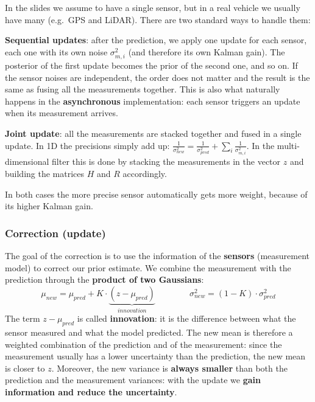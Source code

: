 \begin{infobox}
In the slides we assume to have a single sensor, but in a real vehicle we usually have many (e.g.\ GPS and LiDAR). There are two standard ways to handle them:
\begin{compactitemize}
    \item \textbf{Sequential updates}: after the prediction, we apply one update for each sensor, each one with its own noise $\sigma^2_{m,i}$ (and therefore its own Kalman gain). The posterior of the first update becomes the prior of the second one, and so on. If the sensor noises are independent, the order does not matter and the result is the same as fusing all the measurements together. This is also what naturally happens in the \textbf{asynchronous} implementation: each sensor triggers an update when its measurement arrives.
    \item \textbf{Joint update}: all the measurements are stacked together and fused in a single update. In 1D the precisions simply add up: $\frac{1}{\sigma^2_{new}} = \frac{1}{\sigma^2_{pred}} + \sum_i \frac{1}{\sigma^2_{m,i}}$. In the multi-dimensional filter this is done by stacking the measurements in the vector $z$ and building the matrices $H$ and $R$ accordingly.
\end{compactitemize}
In both cases the more precise sensor automatically gets more weight, because of its higher Kalman gain.
\end{infobox}

\subsubsection{Correction (update)}
The goal of the correction is to use the information of the \textbf{sensors} (measurement model) to correct our prior estimate.
We combine the measurement with the prediction through the \textbf{product of two Gaussians}:
\[
\mu_{new} = \mu_{pred} + K \cdot \underbrace{(z - \mu_{pred})}_{innovation} \qquad\qquad \sigma^2_{new} = (1 - K) \cdot \sigma^2_{pred}
\]
The term $z - \mu_{pred}$ is called \textbf{innovation}: it is the difference between what the sensor measured and what the model predicted.
The new mean is therefore a weighted combination of the prediction and of the measurement: since the measurement usually has a lower uncertainty than the prediction, the new mean is closer to $z$.
Moreover, the new variance is \textbf{always smaller} than both the prediction and the measurement variances: with the update we \textbf{gain information and reduce the uncertainty}.

